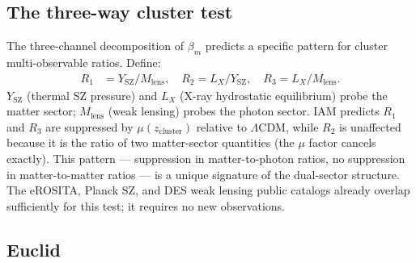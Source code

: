 \documentclass[12pt,a4paper]{article}
\begin{document}
\subsection{The three-way cluster test}
\label{sec:threeway}

The three-channel decomposition of $\beta_m$ predicts a specific pattern for cluster
multi-observable ratios. Define:
\begin{align*}
  R_1 &= Y_\mathrm{SZ} / M_\mathrm{lens}, \quad
  R_2 = L_X / Y_\mathrm{SZ}, \quad
  R_3 = L_X / M_\mathrm{lens}.
\end{align*}
$Y_\mathrm{SZ}$ (thermal SZ pressure) and $L_X$ (X-ray hydrostatic equilibrium) probe
the matter sector; $M_\mathrm{lens}$ (weak lensing) probes the photon sector.
IAM predicts $R_1$ and $R_3$ are suppressed by $\mu(z_\mathrm{cluster})$ relative to
$\Lambda$CDM, while $R_2$ is unaffected because it is the ratio of two matter-sector
quantities (the $\mu$ factor cancels exactly). This pattern --- suppression in
matter-to-photon ratios, no suppression in matter-to-matter ratios --- is a unique
signature of the dual-sector structure. The eROSITA, Planck SZ, and DES weak lensing
public catalogs already overlap sufficiently for this test; it requires no new
observations.

\subsection{Euclid}
\label{sec:euclid}

\begin{table}[h]
\centering
\small
\caption{Projected IAM detection significance at each Euclid data release.
Forecast $\sigma(\mu_0)$ values from \citet{Euclid2020}.}
\label{tab:euclid}
\end{table}
\end{document}
